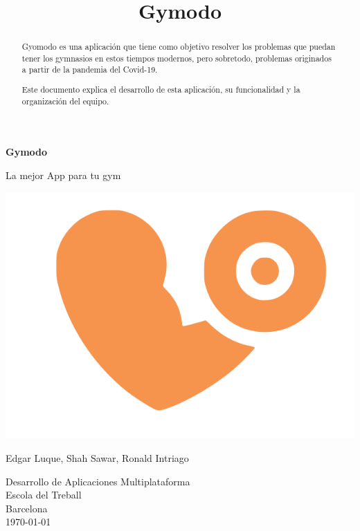 \documentclass[12pt,a4paper]{article}
\title{Gymodo}
\begin{document}
\begin{titlepage}
    \begin{center}
        \vspace*{1cm}
            
        \Huge
        \textbf{Gymodo}
            
        \vspace{0.5cm}
        \LARGE
        La mejor App para tu gym
        
        \includegraphics[width=\textwidth]{gymodo_logo}
        
        \vfill
        

        Edgar Luque, Shah Sawar, Ronald Intriago\\
            
        \vspace{0.8cm}
           
            
        \Large
        Desarrollo de Aplicaciones Multiplataforma\\
        Escola del Treball\\
        Barcelona\\
        \today
            
    \end{center}
\end{titlepage}

\newpage

\begin{abstract}
Gyomodo es una aplicación que tiene como objetivo resolver los problemas que puedan tener los gymnasios en estos tiempos modernos, pero sobretodo, problemas originados a partir de la pandemia del Covid-19.

Este documento explica el desarrollo de esta aplicación, su funcionalidad y la organización del equipo.
\end{abstract}
\end{document}
